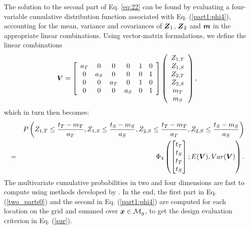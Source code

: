 \documentclass[aoas]{imsart}
\begin{document}
The solution to the second part of Eq. \eqref{eq:22} can be found by evaluating a four-variable cumulative distribution function associated
with Eq. (\ref{part1:phi4}), accounting for the mean, variance and
covariances of ${\boldsymbol Z}_1$, ${\boldsymbol Z}_2$ and ${\boldsymbol m}$ in the appropriate linear
combinations. Using vector-matrix formulations, we define the linear
combinations
\begin{equation}
\label{Vcomb}
    \bV=\left[
    \begin{array}{cccccc}
        a_T & 0 & 0 & 0 & 1 & 0 \\
         0 & a_S & 0 & 0 & 0 & 1 \\
         0 & 0 & a_T & 0 & 1 & 0\\
         0 & 0 & 0 & a_S & 0 & 1\\
    \end{array}
    \right] 
    \left(
    \begin{array}{cccccc}
         Z_{1,T} \\
         Z_{1,S} \\
         Z_{2,T} \\
         Z_{2,S} \\
         m_{T} \\
         m_{S}
    \end{array}
    \right),
\end{equation}
which in turn then becomes:
{\small
\begin{eqnarray}
\label{part1:phi4_2}
&&P \left( Z_{1,T} \leq \frac{t_T-m_{T}}{a_{T}}, 
Z_{1,S} \leq \frac{t_S-m_{S}}{a_{S}}, Z_{2,S} \leq \frac{t_T-m_{T}}{a_{T}}, Z_{2,S} \leq \frac{t_S-m_{S}}{a_{S}} \right)\\
&=&  \Phi_4 
\begin{pmatrix} 
\begin{bmatrix} t_T\\
t_S \\
t_T \\
t_S
\end{bmatrix};
E( \bV),Var(\bV)
\end{pmatrix} \nonumber.
\end{eqnarray}
}
The multivariate cumulative probabilities in two and four dimensions
are fast to compute using methods developed by \cite{genz2009computation}.  In
the end, the first part in Eq. (\ref{two_parts0}) and the second in
Eq. (\ref{part1:phi4}) are computed for each location on the grid and
summed over ${\boldsymbol x} \in \mathcal{M}_g$, to get the design evaluation
criterion in Eq. (\ref{sur}). 
\end{document}
